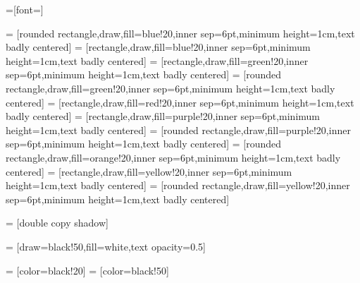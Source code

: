 
=[font=\rmfamily]

 = [rounded rectangle,draw,fill=blue!20,inner sep=6pt,minimum height=1cm,text badly centered]
 = [rectangle,draw,fill=blue!20,inner sep=6pt,minimum height=1cm,text badly centered]
 = [rectangle,draw,fill=green!20,inner sep=6pt,minimum height=1cm,text badly centered]
 = [rounded rectangle,draw,fill=green!20,inner sep=6pt,minimum height=1cm,text badly centered]
 = [rectangle,draw,fill=red!20,inner sep=6pt,minimum height=1cm,text badly centered]
 = [rectangle,draw,fill=purple!20,inner sep=6pt,minimum height=1cm,text badly centered]
 = [rounded rectangle,draw,fill=purple!20,inner sep=6pt,minimum height=1cm,text badly centered]
 = [rounded rectangle,draw,fill=orange!20,inner sep=6pt,minimum height=1cm,text badly centered]
 = [rectangle,draw,fill=yellow!20,inner sep=6pt,minimum height=1cm,text badly centered]
 = [rounded rectangle,draw,fill=yellow!20,inner sep=6pt,minimum height=1cm,text badly centered]

 = [double copy shadow]

 = [draw=black!50,fill=white,text opacity=0.5]

 = [color=black!20]
 = [color=black!50]


